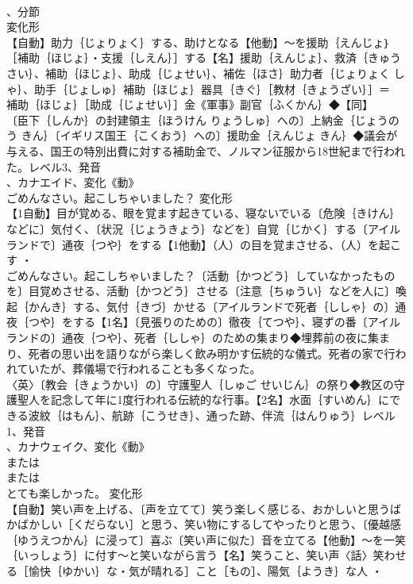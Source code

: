 \documentclass[8pt]{extreport}
\begin{document}
\begin{CJK}{UTF8}{min}
\\	、分節
\\	変化形 
\\	【自動】助力｛じょりょく｝する、助けとなる【他動】～を援助｛えんじょ｝［補助｛ほじょ｝・支援｛しえん｝］する【名】援助｛えんじょ｝、救済｛きゅうさい｝、補助｛ほじょ｝、助成｛じょせい｝、補佐｛ほさ｝助力者｛じょりょく しゃ｝、助手｛じょしゅ｝補助｛ほじょ｝器具｛きぐ｝［教材｛きょうざい｝］＝ 
\\	補助｛ほじょ｝［助成｛じょせい｝］金《軍事》副官｛ふくかん｝◆【同】
\\	〔臣下｛しんか｝の封建領主｛ほうけん りょうしゅ｝への〕上納金｛じょうのう きん｝〔イギリス国王｛こくおう｝への〕援助金｛えんじょ きん｝◆議会が与える、国王の特別出費に対する補助金で、ノルマン征服から18世紀まで行われた。レベル3、発音
\\	、カナエイド、変化《動》
\\	ごめんなさい。起こしちゃいました？	変化形 
\\	【1自動】目が覚める、眼を覚ます起きている、寝ないでいる〔危険｛きけん｝などに〕気付く、〔状況｛じょうきょう｝などを〕自覚｛じかく｝する〔アイルランドで〕通夜｛つや｝をする【1他動】（人）の目を覚まさせる、（人）を起こす ・
\\	ごめんなさい。起こしちゃいました？〔活動｛かつどう｝していなかったものを〕目覚めさせる、活動｛かつどう｝させる〔注意｛ちゅうい｝などを人に〕喚起｛かんき｝する、気付｛きづ｝かせる〔アイルランドで死者｛ししゃ｝の〕通夜｛つや｝をする【1名】〔見張りのための〕徹夜｛てつや｝、寝ずの番〔アイルランドの〕通夜｛つや｝、死者｛ししゃ｝のための集まり◆埋葬前の夜に集まり、死者の思い出を語りながら楽しく飲み明かす伝統的な儀式。死者の家で行われていたが、葬儀場で行われることも多くなった。
\\	〈英〉〔教会｛きょうかい｝の〕守護聖人｛しゅご せいじん｝の祭り◆教区の守護聖人を記念して年に1度行われる伝統的な行事。【2名】水面｛すいめん｝にできる波紋｛はもん｝、航跡｛こうせき｝、通った跡、伴流｛はんりゅう｝レベル1、発音
\\	、カナウェイク、変化《動》
\\	または
\\	または
\\	とても楽しかった。	変化形 
\\	【自動】笑い声を上げる、〔声を立てて〕笑う楽しく感じる、おかしいと思うばかばかしい［くだらない］と思う、笑い物にするしてやったりと思う、〔優越感｛ゆうえつかん｝に浸って〕喜ぶ〔笑い声に似た〕音を立てる【他動】～を一笑｛いっしょう｝に付す～と笑いながら言う【名】笑うこと、笑い声〈話〉笑わせる［愉快｛ゆかい｝な・気が晴れる］こと［もの］、陽気｛ようき｝な人 ・

\end{CJK}
\end{document}
